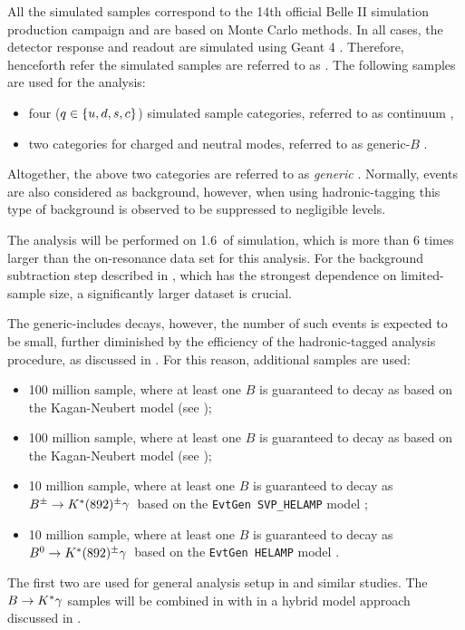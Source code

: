 All the simulated samples correspond to the 14th official Belle II simulation production campaign and are based on Monte Carlo methods.
In all cases, the detector response and readout are simulated using Geant 4 \cite{GEANT4:2002zbu}.
Therefore, henceforth refer the simulated samples are referred to as \MC.
The following samples are used for the analysis:
\begin{itemize}
    \item four \epem\ra\qqbar ($q\in\{u,d,s,c\}$) simulated sample categories, referred to as continuum \MC,
    \item two \FourS\ra\BB categories for charged and neutral \B modes, referred to as generic-$B$ \MC.
\end{itemize}
Altogether, the above two categories are referred to as \textit{generic} \MC.
Normally, \epem\ra\tautau events are also considered as background, however, when using hadronic-tagging this type of background is observed to be suppressed to negligible levels.

The analysis will be performed on 1.6~\invab of simulation, which is more than 6 times larger than the on-resonance data set for this analysis.
For the background subtraction step described in , which has the strongest dependence on limited-\MC sample size, a significantly larger dataset is crucial.

The generic-\B \MC includes \BtoXsgamma decays, however, the number of such events is expected to be small, further diminished by the efficiency of the hadronic-tagged analysis procedure, as discussed in .
For this reason, additional samples are used:
\begin{itemize}
    \item 100 million \BpBm sample, where at least one $B$ is guaranteed to decay as \BptoXsgamma based on the Kagan-Neubert model \cite{Kagan:1998ym} (see );
    \item 100 million \BzBzb sample, where at least one $B$ is guaranteed to decay as \BztoXsgamma based on the Kagan-Neubert model \cite{Kagan:1998ym} (see );
    \item 10 million \BpBm sample, where at least one $B$ is guaranteed to decay as $B^\pm\rightarrow K^*(892)^{\pm}\gamma$~based on the \texttt{EvtGen SVP\_HELAMP} model \cite{Ryd:2005zz};
    \item 10 million \BzBzb sample, where at least one $B$ is guaranteed to decay as $B^0\rightarrow K^*(892)^{\pm}\gamma$~based on the \texttt{EvtGen HELAMP} model \cite{Ryd:2005zz}.
\end{itemize}
The first two are used for general analysis setup in 
 and similar studies.
The $B\rightarrow K^*\gamma$ samples will be combined in with \BtoXsgamma in a hybrid model approach \cite{Ramirez:1989yk} discussed in .

